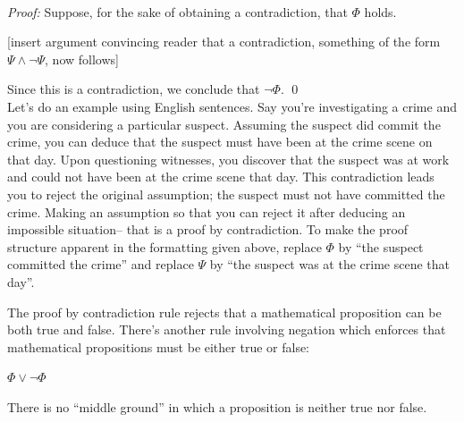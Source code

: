 \documentclass[12pt]{article}
\newcommand{\done}{\\\hspace*{0pt}\hfill$\blacksquare$}
\newcommand{\AND}{\wedge}
\newcommand{\OR}{\vee}
\newcounter{exercise}
\newcounter{rule}
\newcounter{theorem}
\def\putRuleNumber{\refstepcounter{rule}\therule}
\newcommand{\indented}[1]{\begin{adjustwidth}{1em}{}#1\end{adjustwidth}}
\def\thmcolonspace{\hspace{1em}}
\def\proofnewline{\\[0.75em]} %
\def\done{\qed\\[0em]} %
\newcommand{\thmbox}[1]{\fbox{\parbox{\textwidth}{{#1}}}}
\newcommand{\THMMOCK}[2]{\thmbox{\textbf{Theorem:} \thmcolonspace #1} \proofnewline \textit{Proof:} #2\done}
\newcommand{\RULE}[2]{\begin{tcolorbox}[title=Rule \putRuleNumber: #1,colbacktitle=white,coltitle=black,colback=white]#2\end{tcolorbox}}
\def\pA{\Phi}
\def\pB{\Psi}
\begin{document}
\THMMOCK{$\neg\pA$.}{
Suppose, for the sake of obtaining a contradiction, that $\pA$ holds.
\indented{[insert argument convincing reader that a contradiction, something of the form $\pB\AND\neg\pB$, now follows]}
Since this is a contradiction, we conclude that $\neg\pA$.
}

Let's do an example using English sentences.
Say you're investigating a crime and you are considering a particular suspect.
Assuming the suspect did commit the crime, you can deduce that the suspect must have been at the crime scene on that day.
Upon questioning witnesses, you discover that the suspect was at work and could not have been at the crime scene that day.
This contradiction leads you to reject the original assumption; the suspect must not have committed the crime.
Making an assumption so that you can reject it after deducing an impossible situation-- that is a proof by contradiction.
To make the proof structure apparent in
the formatting given above, replace
$\pA$ by ``the suspect committed the crime'' and replace $\pB$ by ``the suspect was at the crime scene that day''.


The proof by contradiction rule rejects that a mathematical proposition can be both true and false.
There's
another rule involving negation which
enforces that mathematical propositions must be either true or false:
\RULE{Excluded middle}{
$\pA\OR\neg\pA$
}
There is no ``middle ground'' in which a proposition is neither true nor false.











\end{document}
